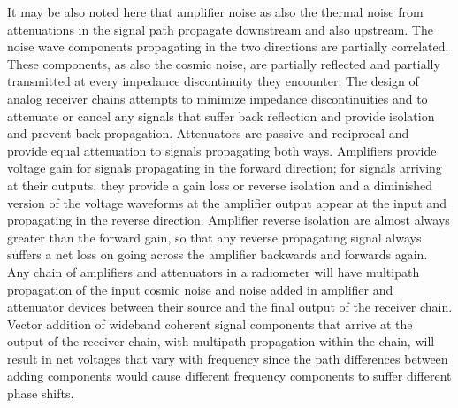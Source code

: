    It may be also noted here that amplifier noise as also the thermal noise from attenuations in the signal path propagate downstream and also upstream.  The noise wave components propagating in the two directions are partially correlated.  These components, as also the cosmic noise, are partially reflected and partially transmitted at every impedance discontinuity they encounter.  The design of analog receiver chains attempts to minimize impedance discontinuities and to attenuate or cancel any signals that suffer back reflection and provide isolation and prevent back propagation. Attenuators are passive and reciprocal and provide equal attenuation to signals propagating both ways.  Amplifiers provide voltage gain for signals propagating in the forward direction; for signals arriving at their outputs, they provide a gain loss or reverse isolation and a diminished version of the voltage waveforms at the amplifier output appear at the input and propagating in the reverse direction.  Amplifier reverse isolation are almost always greater than the forward gain, so that any reverse propagating signal always suffers a net loss on going across the amplifier backwards and forwards again.  Any chain of amplifiers and attenuators in a radiometer will have multipath propagation of the input cosmic noise and noise added in amplifier and attenuator devices between their source and the final output of the receiver chain.  Vector addition of wideband coherent signal components that arrive at the output of the receiver chain, with multipath propagation within the chain, will result in net voltages that vary with frequency since the path differences between adding components would cause different frequency components to suffer different phase shifts.
   
